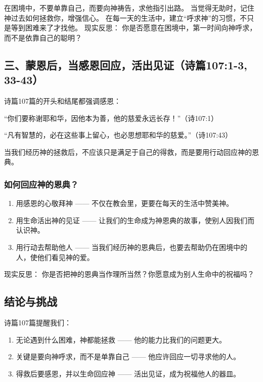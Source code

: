 \documentclass[a4paper, 12pt]{article}
\begin{document}
在困境中，不要单靠自己，而要向神祷告，求他指引出路。
当觉得无助时，记住神过去如何拯救你，增强信心。
在每一天的生活中，建立“呼求神”的习惯，不只是等到困难来了才找他。
现实反思： 你是否愿意在困境中，第一时间向神呼求，而不是依靠自己的聪明？

\subsection*{三、蒙恩后，当感恩回应，活出见证（诗篇107:1-3, 33-43）}
诗篇107篇的开头和结尾都强调感恩：

“你们要称谢耶和华，因他本为善，他的慈爱永远长存！”（诗107:1）

“凡有智慧的，必在这些事上留心，也必思想耶和华的慈爱。”（诗107:43）

当我们经历神的拯救后，不应该只是满足于自己的得救，而是要用行动回应神的恩典。

\subsubsection*{如何回应神的恩典？}
\begin{enumerate}
    \item 用感恩的心敬拜神 —— 不仅在教会里，更要在每天的生活中赞美神。

    \item 用生命活出神的见证 —— 让我们的生命成为神恩典的故事，使别人因我们而认识神。

    \item 用行动去帮助他人 —— 当我们经历神的恩典后，也要去帮助仍在困境中的人，使他们看见神的爱。

\end{enumerate}

现实反思： 你是否把神的恩典当作理所当然？你愿意成为别人生命中的祝福吗？

\subsection*{结论与挑战}
诗篇107篇提醒我们：
\begin{enumerate}
    \item 无论遇到什么困难，神都能拯救 —— 他的能力比我们的问题更大。

    \item 关键是要向神呼求，而不是单靠自己 —— 他应许回应一切寻求他的人。

    \item 得救后要感恩，并以生命回应神 —— 活出见证，成为祝福他人的器皿。

\end{enumerate}
\end{document}

